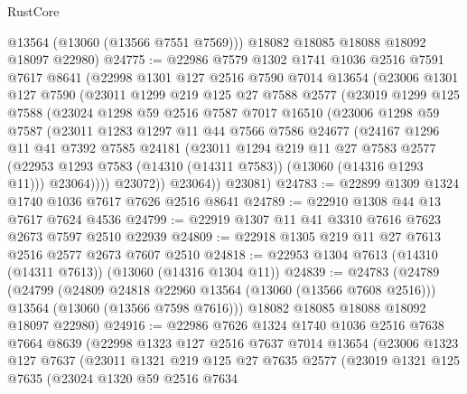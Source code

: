 \begin{lexlean}{RustCore}
\begin{coremodule}
        @13564
        (@13060 (@13566 @7551 @7569)))
      @18082
      @18085
      @18088
      @18092
      @18097
      @22980)
@24775 := @22986
    @7579
    @1302
    @1741
    @1036
    @2516
    @7591
    @7617
    @8641
    (@22998
      @1301
      @127
      @2516
      @7590
      @7014
      @13654
      (@23006
        @1301
        @127
        @7590
        (@23011
          @1299
          @219
          @125
          @27
          @7588
          @2577
          (@23019
            @1299
            @125
            @7588
            (@23024
              @1298
              @59
              @2516
              @7587
              @7017
              @16510
              (@23006
                @1298
                @59
                @7587
                (@23011
                  @1283
                  @1297
                  @11
                  @44
                  @7566
                  @7586
                  @24677
                  (@24167
                    @1296
                    @11
                    @41
                    @7392
                    @7585
                    @24181
                    (@23011
                      @1294
                      @219
                      @11
                      @27
                      @7583
                      @2577
                      (@22953 @1293 @7583 (@14310 (@14311 @7583)) (@13060 (@14316 @1293 @11)))
                      @23064))))
              @23072))
          @23064))
      @23081)
@24783 := @22899 @1309 @1324 @1740 @1036 @7617 @7626 @2516 @8641
@24789 := @22910 @1308 @44 @13 @7617 @7624 @4536
@24799 := @22919 @1307 @11 @41 @3310 @7616 @7623 @2673 @7597 @2510 @22939
@24809 := @22918 @1305 @219 @11 @27 @7613 @2516 @2577 @2673 @7607 @2510
@24818 := @22953 @1304 @7613 (@14310 (@14311 @7613)) (@13060 (@14316 @1304 @11))
@24839 := @24783
    (@24789
      (@24799
        (@24809 @24818 @22960 @13564 (@13060 (@13566 @7608 @2516)))
        @13564
        (@13060 (@13566 @7598 @7616)))
      @18082
      @18085
      @18088
      @18092
      @18097
      @22980)
@24916 := @22986
    @7626
    @1324
    @1740
    @1036
    @2516
    @7638
    @7664
    @8639
    (@22998
      @1323
      @127
      @2516
      @7637
      @7014
      @13654
      (@23006
        @1323
        @127
        @7637
        (@23011
          @1321
          @219
          @125
          @27
          @7635
          @2577
          (@23019
            @1321
            @125
            @7635
            (@23024
              @1320
              @59
              @2516
              @7634

\end{coremodule}
\end{lexlean}
